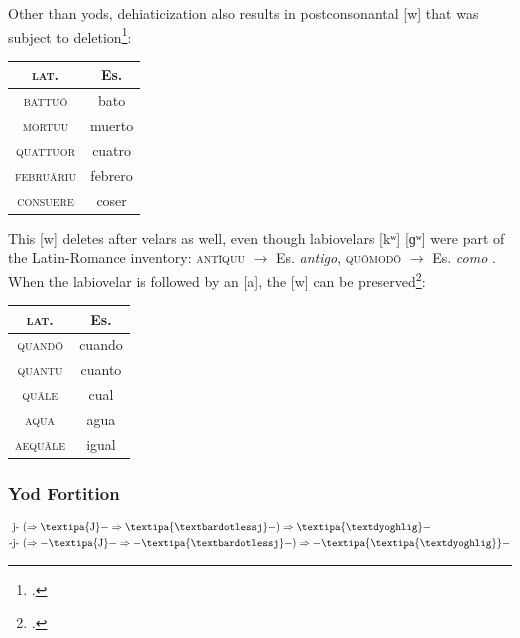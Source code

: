 \documentclass{report}[12pt]
\begin{document}
Other than yods, dehiaticization also results in postconsonantal [w] that was subject to deletion\footcite[p.~134-135]{lloyd_spanish}:
\begin{center}
  \begin{tabular}{c c}
    \textsc{lat.} & Es. \\
    \hline
    \textsc{battu\={o}} & bato \\
    \textsc{mortuu} & muerto \\
    \textsc{quattuor} & cuatro \\
    \textsc{febru\={a}riu} & febrero \\
    \textsc{consuere} & coser \\
  \end{tabular}
\end{center}
This [w] deletes after velars as well, even though labiovelars [kʷ] [ɡʷ] were part of the Latin-Romance inventory: \textsc{ant\={i}quu} $\rightarrow$ Es. \emph{antigo}, \textsc{qu\={o}mod\={o}} $\rightarrow$ Es. \emph{como} \parencite[p.~135]{lloyd_spanish}. When the labiovelar is followed by an [a], the [w] can be preserved\footcite[p.~135]{lloyd_spanish}:
\begin{center}
  \begin{tabular}{c c}
    \textsc{lat.} & Es. \\
    \hline
    \textsc{quand\={o}} & cuando \\
    \textsc{quantu} & cuanto \\
    \textsc{qu\={a}le} & cual \\
    \textsc{aqua} & agua \\
    \textsc{aequ\={a}le} & igual \\
  \end{tabular}
\end{center}

\subsubsection{Yod Fortition}

\begin{tcolorbox}
  \begin{align*}
    \text{j-} &\ (\Rightarrow \text{\textipa{J}}- \Rightarrow \text{\textipa{\textbardotlessj}}-) \Rightarrow \text{\textipa{\textdyoghlig}}- \\
    \text{-j-} &\ (\Rightarrow -\text{\textipa{J}}- \Rightarrow -\text{\textipa{\textbardotlessj}}-) \Rightarrow -\text{\textipa{\textipa{\textdyoghlig}}}- \\
  \end{align*}
\end{tcolorbox}
\end{document}
